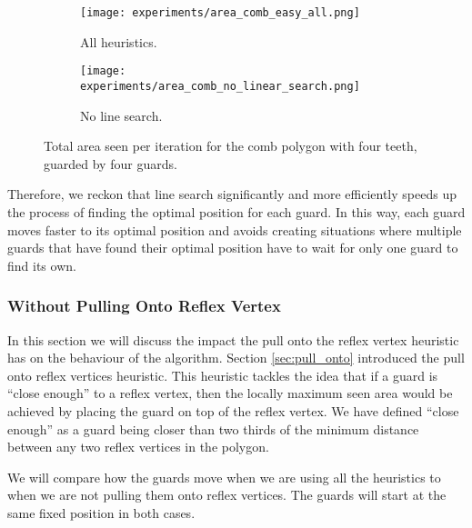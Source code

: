 \begin{figure}[h!]
    \centering
    \begin{subfigure}{0.45\textwidth}
        \texttt{[image: experiments/area\_comb\_easy\_all.png]}
        \caption{All heuristics.}
        \label{fig:no_line_search1}
    \end{subfigure}
    \begin{subfigure}{0.45\textwidth}
        \texttt{[image: experiments/area\_comb\_no\_linear\_search.png]}
        \caption{No line search.}
        \label{fig:no_line_search2}
    \end{subfigure}
    \caption{Total area seen per iteration for the comb polygon with four teeth, guarded by four guards.}
    \label{fig:no_line_search}
\end{figure}

Therefore, we reckon that line search significantly and more efficiently speeds up the process of finding the optimal position for each guard. In this way, each guard moves faster to its optimal position and avoids creating situations where multiple guards that have found their optimal position have to wait for only one guard to find its own.

\subsubsection{Without Pulling Onto Reflex Vertex}
In this section we will discuss the impact the pull onto the reflex vertex heuristic has on the behaviour of the algorithm. Section \ref{sec:pull_onto} introduced the pull onto reflex vertices heuristic. This heuristic tackles the idea that if a guard is ``close enough'' to a reflex vertex, then the locally maximum seen area would be achieved by placing the guard on top of the reflex vertex. We have defined ``close enough'' as a guard being closer than two thirds of the minimum distance between any two reflex vertices in the polygon.

We will compare how the guards move when we are using all the heuristics to when we are not pulling them onto reflex vertices. The guards will start at the same fixed position in both cases.


